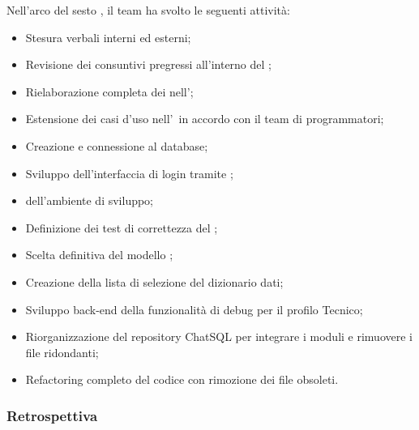Nell'arco del sesto , il team ha svolto le seguenti attività:
\begin{itemize}
    \item Stesura verbali interni ed esterni;
    \item Revisione dei consuntivi pregressi all'interno del \PdP;
    \item Rielaborazione completa dei  nell'\AdR;
    \item Estensione dei casi d'uso nell'\AdR\ in accordo con il team di programmatori;
    \item Creazione e connessione al database;
    \item Sviluppo dell'interfaccia di login tramite ;
    \item {} dell'ambiente di sviluppo;
    \item Definizione dei test di correttezza del ;
    \item Scelta definitiva del modello ;
    \item Creazione della lista di selezione del dizionario dati;
    \item Sviluppo back-end della funzionalità di debug per il profilo Tecnico;
    \item Riorganizzazione del repository ChatSQL per integrare i moduli e rimuovere i file ridondanti;
    \item Refactoring completo del codice con rimozione dei file obsoleti.
\end{itemize}

\subsubsection{Retrospettiva}

